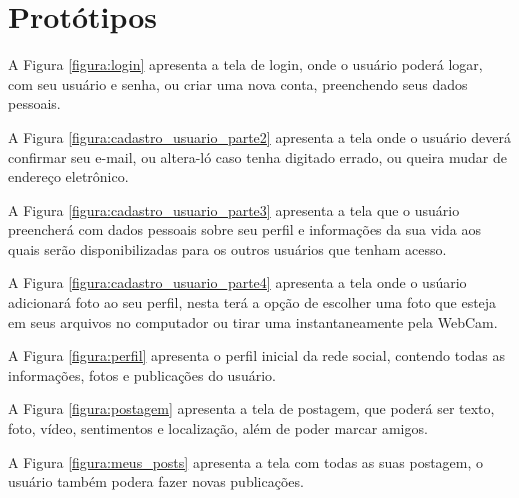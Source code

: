 \chapter{Protótipos}

A Figura \ref{figura:login} apresenta a tela de login, onde o usuário poderá logar, com seu usuário e senha, ou criar uma nova conta, preenchendo seus dados pessoais.


A Figura \ref{figura:cadastro_usuario_parte2}  apresenta a tela onde o usuário deverá confirmar seu e-mail, ou altera-ló caso tenha digitado errado, ou queira mudar de endereço eletrônico.


A Figura \ref{figura:cadastro_usuario_parte3} apresenta a tela que o usuário preencherá com dados pessoais sobre seu perfil e informações da sua vida aos quais serão disponibilizadas para os outros usuários que tenham acesso.


A Figura \ref{figura:cadastro_usuario_parte4} apresenta a tela onde o usúario adicionará foto ao seu perfil, nesta terá a opção de escolher uma foto que esteja em seus arquivos no computador ou tirar uma instantaneamente pela WebCam.


A Figura \ref{figura:perfil} apresenta o perfil inicial da rede social, contendo todas as informações, fotos e publicações do usuário.


A Figura \ref{figura:postagem} apresenta a tela de postagem, que poderá ser texto, foto, vídeo, sentimentos e localização, além de poder marcar amigos.


A Figura \ref{figura:meus_posts} apresenta a tela com todas as suas postagem, o usuário também podera fazer novas publicações.


